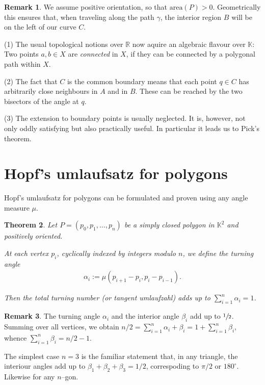 \documentclass[a4paper]{amsart}
\numberwithin{equation}{section}
\theoremstyle{plain}
\newtheorem{theorem}{Theorem}[section]
\theoremstyle{definition}
\newtheorem{remark}[theorem]{Remark}
\newcommand{\R}{\mathbb{R}}
\newcommand{\K}{\mathbb{K}}
\newcommand{\ee}[2]{\mathopen] #1, #2 \mathclose[}
\newcommand{\area}{\mathrm{area}}
\begin{document}
\begin{remark}
  We assume positive orientation, so that $\area(P) > 0$.
  Geometrically this ensures that, when traveling along the path $\gamma$,
  the interior region $B$ will be on the left of our curve $C$.
  
  (1) The usual topological notions over $\R$
  now aquire an algebraic flavour over $\K$:
  Two points $a,b \in X$ are \emph{connected} in $X$,
  if they can be connected by a polygonal path within $X$.
  
  (2) The fact that $C$ is the common boundary means that
  each point $q \in C$ has arbitrarily close neighbours in $A$ and in $B$.
  These can be reached by the two bisectors of the angle at $q$.

  (3) The extension to boundary points is usually neglected. %
  It is, however, not only oddly satisfying but also practically useful.
  In particular it leads us to Pick's theorem. %
\end{remark}


\setcounter{section}{7}
\section{Hopf's umlaufsatz for polygons}

Hopf's umlaufsatz for polygons can be formulated
and proven using any angle measure $\mu$.

\begin{theorem}
  Let $P = (p_0,p_1,\ldots,p_n)$ be a simply closed
  polygon in $\K^2$ and positively oriented.
  
  At each vertex $p_i$, cyclically indexed
  by integers modulo $n$, we define the turning angle
  \begin{align*}
    \alpha_i := \mu(p_{i+1}-p_i, p_i-p_{i-1}) .
  \end{align*}

  Then the total turning number (or tangent umlaufzahl)
  adds up to $\sum_{i=1}^n \alpha_i = 1$.
\end{theorem}

\begin{remark}
  The turning angle $\alpha_i$ and the interior angle $\beta_i$
  add up to $\sfrac{1}{2}$.  Summing over all vertices, we obtain
  $n/2 = \sum_{i=1}^n \alpha_i + \beta_i = 1 + \sum_{i=1}^n \beta_i$,
  whence $\sum_{i=1}^n \beta_i = n/2 - 1$.

  The simplest case $n=3$ is the familiar statement that,
  in any triangle, the interiour angles add up
  to $\beta_1 + \beta_2 + \beta_3 = 1/2$,
  correspoding to $\pi/2$ or $180^\circ$.
  Likewise for any $n$--gon.
\end{remark}
\end{document}

